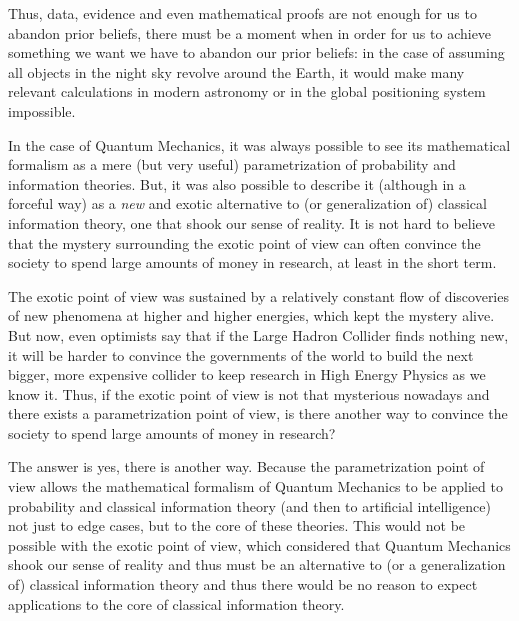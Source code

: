 \documentclass[11pt]{book}
\begin{document}
Thus, data, evidence and even mathematical proofs are not enough for us
to abandon prior beliefs, there must be a moment when in order for us to
achieve something we want we have to abandon our prior beliefs: in the
case of assuming all objects in the night sky revolve around the Earth,
it would make many relevant calculations in modern astronomy or in the
global positioning system~ impossible.

In the case of Quantum Mechanics, it was always possible to see its
mathematical formalism as a mere (but very useful) parametrization of
probability and information theories. But, it was also possible to
describe it (although in a forceful way) as a \emph{new} and exotic
alternative to (or generalization of) classical information theory, one
that shook our sense of reality. It is not hard to believe that the
mystery surrounding the exotic point of view can often convince the
society to spend large amounts of money in research, at least in the
short term.

The exotic point of view was sustained by a relatively constant flow of
discoveries of new phenomena at higher and higher energies, which kept
the mystery alive. But now, even optimists say that if the Large Hadron
Collider finds nothing new, it will be harder to convince the
governments of the world to build the next bigger, more expensive
collider to keep research in High Energy Physics as we know
it\cite{nightmare}. Thus, if the exotic
point of view is not that mysterious nowadays and there exists a
parametrization point of view, is there another way to convince the
society to spend large amounts of money in research?

The answer is yes, there is another way. Because the parametrization
point of view allows the mathematical formalism of Quantum Mechanics to
be applied to probability and classical information theory (and then to
artificial intelligence) not just to edge cases, but to the core of
these theories. This would not be possible with the exotic point of
view, which considered that Quantum Mechanics shook our sense of reality
and thus must be an alternative to (or a generalization of) classical
information theory and thus there would be no reason to expect
applications to the core of classical information theory.
\end{document}
